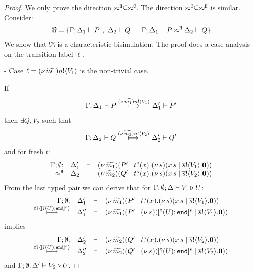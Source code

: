 \begin{proof}
	\noi We only prove the direction $\approx^\mathtt{H} \subseteq \approx^\mathtt{C}$. The
	direction $\approx^\mathtt{C} \subseteq \approx^\mathtt{H}$ is similar.
Consider:
%
	\[
		\Re = \set{\horel{\Gamma}{\Delta_1}{P}{\ ,\ }{\Delta_2}{Q} \setbar \horel{\Gamma}{\Delta_1}{P}{\hwb}{\Delta_2}{Q}}
	\]
%
	We show that $\Re$ is a characteristic bisimulation.
	The proof does a case analysis on the transition label $\ell$.

	\noi - Case $\ell = (\nu\, \widetilde{m_1}) n ! \langle V_1 \rangle$ is the non-trivial case.

	\noi If
%
	\begin{eqnarray}
		\Gamma; \Delta_1 \vdash P \stackrel{(\nu\, \widetilde{m_1}) n ! \langle V_1 \rangle}{\longmapsto} \Delta_1' \vdash P'
		\label{lem:wb_eq_wbf1}
	\end{eqnarray}
	then $\exists Q, V_2$ such that
%
	\begin{eqnarray}
		\horel{\Gamma}{\Delta_2}{Q}{\Hby{\news{\widetilde{m_2}} \bactout{n}{V_2}}}{\Delta_2'}{Q'}
		\label{lem:wb_eq_wbf2}
	\end{eqnarray}
%
	and for fresh $t$:
	\[
		\begin{array}{rcll} \Gamma; \emptyset; &\Delta_1'& \vdash& (\nu\, \widetilde{m_1})(P' \;|\; t ? (x) . (\nu\, s)(x\, {s} \;|\; \overline{s} ! \langle V_1 \rangle . \mathbf{0}))\\ \approx^\mathtt{H} &\Delta_2& \vdash &  (\nu\, \widetilde{m_2})(Q' \;|\; t ? (x) . (\nu\, s)(x\, {s} \;|\; \overline{s} ! \langle V_2 \rangle . \mathbf{0}) ) \end{array}
	\]
%
	From the last typed pair we can derive that for $\Gamma; \emptyset; \Delta \vdash V_1 \triangleright U$:
%
	\[
		\mhorel{\Gamma}{\Delta_1'}{\newsp{\widetilde{m_1}}{P' \Par \hotrigger{t}{x}{s}{V_1}}}
		{\hby{\bactinp{t}{\map{\btinp{U} \tinact}^{x}}}}
		{\Delta_1''}{}{\newsp{\widetilde{m_1}}{P' \Par \newsp{s}{\map{\btinp{U} \tinact}^{s} \Par \bout{\dual{s}}{V_1} \inact}}}
	\]
%
	\noi implies
%
	\[
		\mhorel{\Gamma}{\Delta_2'}{\newsp{\widetilde{m_2}}{Q' \Par \hotrigger{t}{x}{s}{V_2}}}
		{\hby{\bactinp{t}{\map{\btinp{U} \tinact}^{x}}}}
		{\Delta_2''}{}{\newsp{\widetilde{m_2}}{Q' \Par \newsp{s}{\map{\btinp{U} \tinact}^{s} \Par \bout{\dual{s}}{V_2} \inact}}}
	\]
%
	\noi and $\Gamma; \emptyset; \Delta' \vdash V_2 \triangleright U$.


\end{proof}
